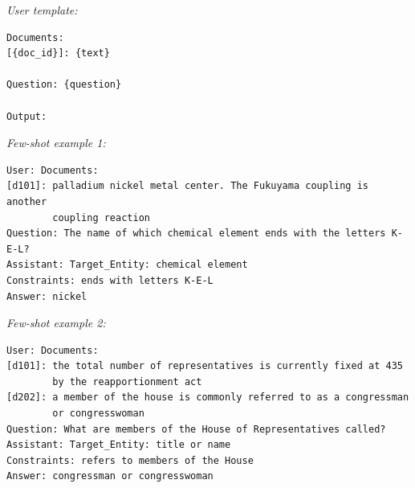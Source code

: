 \documentclass[11pt,a4paper]{article}
\begin{document}
\textit{User template:}
\begin{lstlisting}
Documents:
[{doc_id}]: {text}

Question: {question}

Output:
\end{lstlisting}

\textit{Few-shot example 1:}
\begin{lstlisting}
User: Documents:
[d101]: palladium nickel metal center. The Fukuyama coupling is another
        coupling reaction
Question: The name of which chemical element ends with the letters K-E-L?
Assistant: Target_Entity: chemical element
Constraints: ends with letters K-E-L
Answer: nickel
\end{lstlisting}

\textit{Few-shot example 2:}
\begin{lstlisting}
User: Documents:
[d101]: the total number of representatives is currently fixed at 435
        by the reapportionment act
[d202]: a member of the house is commonly referred to as a congressman
        or congresswoman
Question: What are members of the House of Representatives called?
Assistant: Target_Entity: title or name
Constraints: refers to members of the House
Answer: congressman or congresswoman
\end{lstlisting}
\end{document}
